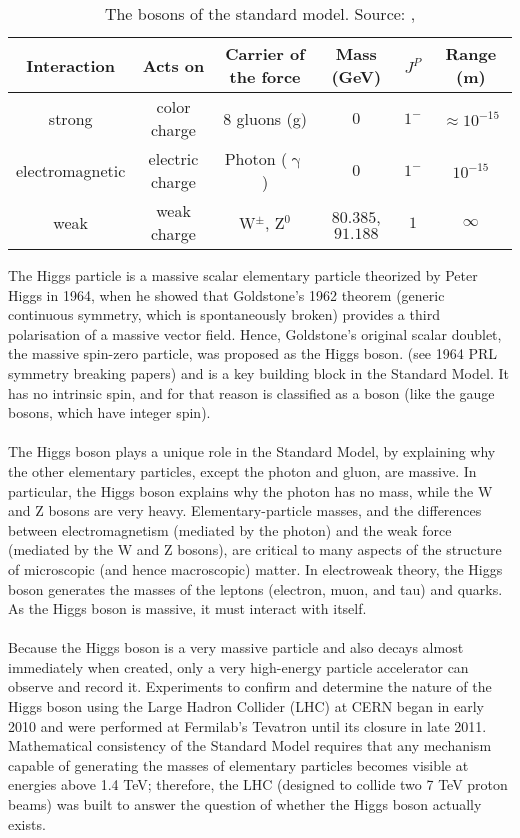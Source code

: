 \begin{table}[h]
	\caption[Bosons described by the SM]{The bosons of the standard model. Source: \cite{povh}, \cite{faltermann}}
	\label{tab:ch_1_sm_bosons}
	\begin{tabular}{cccccc}
		\toprule
		Interaction & Acts on & Carrier of the force & Mass (GeV) & {$J^P$} & Range (m)\\
		\midrule
		strong & color charge & 8 gluons (g) & {$0$} & {$1^-$} & $\approx 10^{-15}$\\
		electromagnetic & electric charge & Photon ($\upgamma$) & {$0$} & {$1^-$} & $10^{-15}$\\
		weak & weak charge & W$^{\pm}$, Z$^0$ & {$80.385$, $91.188$} & {$1$} & $\infty$\\
		\bottomrule
	\end{tabular}
\end{table}
The Higgs particle is a massive scalar elementary particle theorized by Peter Higgs in 1964, when he showed that Goldstone's 1962 theorem (generic continuous symmetry, which is spontaneously broken) provides a third polarisation of a massive vector field. Hence, Goldstone's original scalar doublet, the massive spin-zero particle, was proposed as the Higgs boson. (see 1964 PRL symmetry breaking papers) and is a key building block in the Standard Model. It has no intrinsic spin, and for that reason is classified as a boson (like the gauge bosons, which have integer spin).\\ \\
The Higgs boson plays a unique role in the Standard Model, by explaining why the other elementary particles, except the photon and gluon, are massive. In particular, the Higgs boson explains why the photon has no mass, while the W and Z bosons are very heavy. Elementary-particle masses, and the differences between electromagnetism (mediated by the photon) and the weak force (mediated by the W and Z bosons), are critical to many aspects of the structure of microscopic (and hence macroscopic) matter. In electroweak theory, the Higgs boson generates the masses of the leptons (electron, muon, and tau) and quarks. As the Higgs boson is massive, it must interact with itself.\\ \\
Because the Higgs boson is a very massive particle and also decays almost immediately when created, only a very high-energy particle accelerator can observe and record it. Experiments to confirm and determine the nature of the Higgs boson using the Large Hadron Collider (LHC) at CERN began in early 2010 and were performed at Fermilab's Tevatron until its closure in late 2011. Mathematical consistency of the Standard Model requires that any mechanism capable of generating the masses of elementary particles becomes visible at energies above 1.4 TeV; therefore, the LHC (designed to collide two 7 TeV proton beams) was built to answer the question of whether the Higgs boson actually exists.\\ \\
